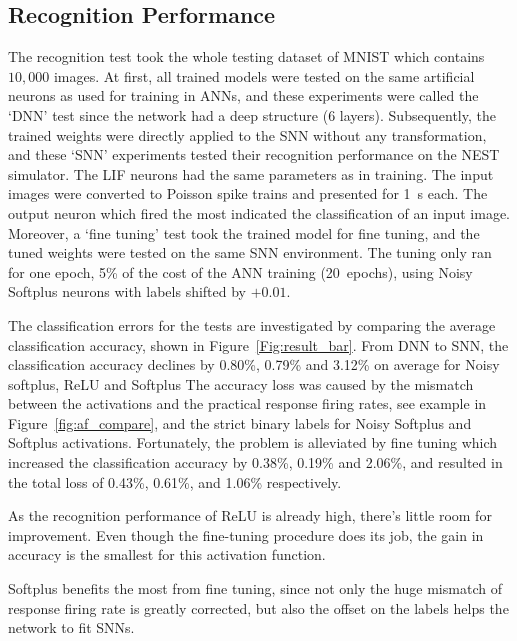 \documentclass{article}
\begin{document}
	\subsection{Recognition Performance}
	\label{subsec:result_compare}
	The recognition test took the whole testing dataset of MNIST which contains $10,000$ images.
	At first, all trained models were tested on the same artificial neurons as used for training in ANNs, and these experiments were called the `DNN' test since the network had a deep structure (6 layers).
	Subsequently, the trained weights were directly applied to the SNN without any transformation, and these `SNN' experiments tested their recognition performance on the NEST simulator.
	The LIF neurons had the same parameters as in training.
	The input images were converted to Poisson spike trains and presented for 1~s each.
	The output neuron which fired the most indicated the classification of an input image.
	Moreover, a `fine tuning' test took the trained model for fine tuning, and the tuned weights were tested on the same SNN environment.
	The tuning only ran for one epoch, 5\% of the cost of the ANN training (20~epochs), using Noisy Softplus neurons with labels shifted by $+0.01$.
	
	The classification errors for the tests are investigated by comparing the average classification accuracy, shown in Figure~\ref{Fig:result_bar}.
	From DNN to SNN, the classification accuracy declines by 0.80\%, 0.79\% and 3.12\% on average for Noisy softplus, ReLU and Softplus
	The accuracy loss was caused by the mismatch between the activations and the practical response firing rates, see example in Figure~\ref{fig:af_compare}, and the strict binary labels for Noisy Softplus and Softplus activations.
	Fortunately, the problem is alleviated by fine tuning which increased the classification accuracy by 0.38\%, 0.19\% and 2.06\%, and resulted in the total loss of 0.43\%, 0.61\%, and 1.06\% respectively.
  
	As the recognition performance of ReLU is already high, there's little room for improvement. Even though the fine-tuning procedure does its job, the gain in accuracy is the smallest for this activation function.
	
	Softplus benefits the most from fine tuning, since not only the huge mismatch of response firing rate is greatly corrected, but also the offset on the labels helps the network to fit SNNs. 
\end{document}
